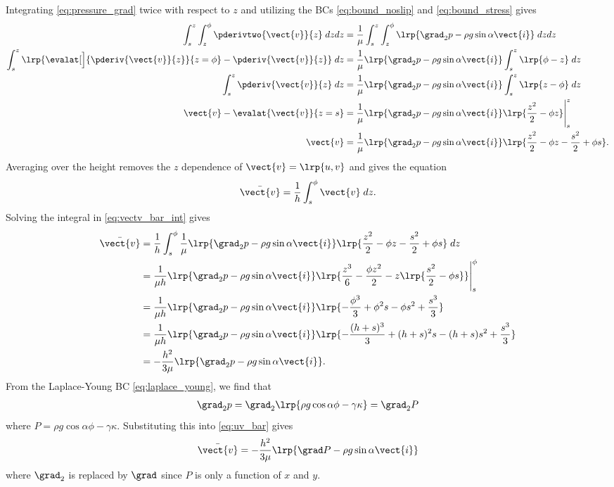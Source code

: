 Integrating \cref{eq:pressure_grad} twice with respect to $z$ and utilizing the BCs  \cref{eq:bound_noslip} and \cref{eq:bound_stress} gives
\begin{align}
    \nonumber \int_{s}^{z}\int_{z}^{\phi} \pderivtwo{\vect{v}}{z} \; dzdz &= \frac{1}{\mu}\int_{s}^{z}\int_{z}^{\phi} \lrp{\grad_2 p - \rho g \sin\alpha\vect{i}} \; dzdz \\
    \nonumber \int_{s}^{z} \lrp{\evalat[\Big]{\pderiv{\vect{v}}{z}}{z = \phi} - \pderiv{\vect{v}}{z}} \; dz &= \frac{1}{\mu} \lrp{\grad_2 p - \rho g \sin\alpha\vect{i}} \int_{s}^{z}\lrp{\phi - z} \; dz\\
    \nonumber \int_{s}^{z} \pderiv{\vect{v}}{z} \; dz &= \frac{1}{\mu} \lrp{\grad_2 p - \rho g \sin\alpha\vect{i}} \int_{s}^{z} \lrp{z - \phi} \; dz\\
    \nonumber \vect{v} - \evalat{\vect{v}}{z = s} &= \frac{1}{\mu} \lrp{\grad_2 p - \rho g \sin\alpha\vect{i}}  \lrp{\frac{z^2}{2} - \phi z} \Bigg|_{s}^z\\
    \vect{v} &=\frac{1}{\mu} \lrp{\grad_2 p - \rho g \sin\alpha\vect{i}} \lrp{\frac{z^2}{2} - \phi z - \frac{s^2}{2} + \phi s}. 
    \label{eq:vel_vectv}
\end{align}
Averaging over the height removes the $z$ dependence of $\vect{v} = \lrp{u, v}$ and gives the equation 
\begin{align}
    \bar{\vect{v}} = \frac{1}{h} \int_{s}^{\phi} \vect{v} \; dz.
    \label{eq:vectv_bar_int}
\end{align}
Solving the integral in \cref{eq:vectv_bar_int} gives 
\begin{align}
    \nonumber \bar{\vect{v}} &= \frac{1}{h} \int_{s}^{\phi} \frac{1}{\mu} \lrp{\grad_2 p - \rho g \sin\alpha\vect{i}} \lrp{\frac{z^2}{2} - \phi z - \frac{s^2}{2} + \phi s}  \; dz\\
    \nonumber &= \frac{1}{\mu h} \lrp{\grad_2 p - \rho g \sin\alpha\vect{i}} \lrp{\frac{z^3}{6} - \frac{\phi z^2}{2} - z\lrp{\frac{s^2}{2} - \phi s}} \Bigg|_{s}^{\phi}\\
    \nonumber &= \frac{1}{\mu h} \lrp{\grad_2 p - \rho g \sin\alpha\vect{i}} \lrp{-\frac{\phi^3}{3} + \phi^2s - \phi s^2 + \frac{s^3}{3}}\\
    \nonumber &=  \frac{1}{\mu h} \lrp{\grad_2 p - \rho g \sin\alpha\vect{i}} \lrp{-\frac{(h+s)^3}{3} + (h+s)^2s - (h+s) s^2 + \frac{s^3}{3}}\\
    &= -\frac{h^2}{3\mu} \lrp{\grad_2 p - \rho g \sin\alpha\vect{i}}.
    \label{eq:uv_bar}
\end{align}
From the Laplace-Young BC \cref{eq:laplace_young}, we find that 
\begin{align}
    \grad_2 p = \grad_2 \lrp{\rho g \cos \alpha \phi - \gamma \kappa} = \grad_2 P
    \label{eq:grad2_p}
\end{align}
where $P = \rho g \cos \alpha \phi - \gamma \kappa$. Substituting this into \cref{eq:uv_bar} gives 
\begin{align}
    \bar{\vect{v}} = -\frac{h^2}{3\mu} \lrp{\grad P - \rho g \sin \alpha \vect{i}}
    \label{eq:uv_bar_final}
\end{align}
where $\grad_2$ is replaced by $\grad$ since $P$ is only a function of $x$ and $y$. 

